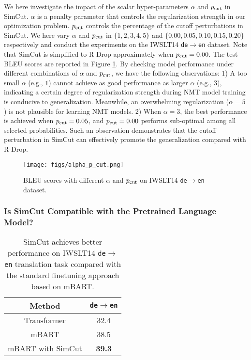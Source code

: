 \documentclass[11pt]{article}
\begin{document}
We here investigate the impact of the scalar hyper-parameters $\alpha$ and $p_{\rm cut}$ in SimCut. $\alpha$ is a penalty parameter that controls the regularization strength in our optimization problem. $p_{\rm cut}$ controls the percentage of the cutoff perturbations in SimCut. We here vary $\alpha$ and $p_{\rm cut}$ in $\{1, 2, 3, 4, 5\}$ and $\{0.00, 0.05, 0.10, 0.15, 0.20\}$ respectively and conduct the experiments on the IWSLT14 \texttt{de}$\rightarrow$\texttt{en} dataset. Note that SimCut is simplified to R-Drop approximately when $p_{\rm cut}=0.00$. The test BLEU scores are reported in Figure \ref{fig: alpha_p}. By checking model performance under different combinations of $\alpha$ and $p_{\rm cut}$, we have the following observations: 1) A too small $\alpha$ (e.g., $1$) cannot achieve as good performance as larger $\alpha$ (e.g., $3$), indicating a certain degree of regularization strength during NMT model training is conducive to generalization. Meanwhile, an overwhelming regularization ($\alpha=5$) is not plausible for learning NMT models. 2) When $\alpha=3$, the best performance is achieved when $p_{\rm cut}=0.05$, and $p_{\rm cut}=0.00$ performs sub-optimal among all selected probabilities. Such an observation demonstrates that the cutoff perturbation in SimCut can effectively promote the generalization compared with R-Drop. 

\begin{figure}[h]
\centering
\texttt{[image: figs/alpha\_p\_cut.png]}
\caption{BLEU scores with different $\alpha$ and $p_{\rm cut}$ on IWSLT14 \texttt{de}$\rightarrow$\texttt{en} dataset.}
\label{fig: alpha_p}
\end{figure}

\subsubsection{Is SimCut Compatible with the Pretrained Language Model?}

\begin{table}
\centering
\begin{tabular}{c|c}
\hline
Method & \texttt{de}$\rightarrow$\texttt{en} \\
\hline\hline
Transformer  & 32.4 \\
mBART & 38.5 \\
\hline
mBART with SimCut & \bf 39.3 \\
\end{tabular}
\caption{SimCut achieves better performance on IWSLT14 \texttt{de}$\rightarrow$\texttt{en} translation task compared with the standard finetuning approach based on mBART. \label{mbart}}
\end{table}
\end{document}
